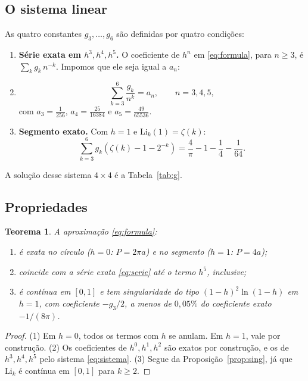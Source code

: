 \documentclass[11pt,a4paper]{article}
\newtheorem{teorema}{Teorema}
\theoremstyle{remark}
\begin{document}
\subsection{O sistema linear}

As quatro constantes $g_3,\dots,g_6$ são definidas por quatro condições:
\begin{enumerate}
\item \textbf{Série exata em $h^3,h^4,h^5$.} O coeficiente de $h^n$ em
\eqref{eq:formula}, para $n\ge3$, é $\sum_k g_k\,n^{-k}$. Impomos que ele seja igual a $a_n$:
\item[] \begin{equation}\label{eq:sistema}
\sum_{k=3}^{6}\frac{g_k}{n^k}=a_n,\qquad n=3,4,5,
\end{equation}
com $a_3=\frac1{256}$, $a_4=\frac{25}{16384}$ e $a_5=\frac{49}{65536}$.
\item \textbf{Segmento exato.} Com $h=1$ e $\mathrm{Li}_k(1)=\zeta(k)$:
\begin{equation}
\sum_{k=3}^{6}g_k\left(\zeta(k)-1-2^{-k}\right)=\frac4\pi-1-\frac14-\frac1{64}.
\end{equation}
\end{enumerate}
A solução desse sistema $4\times4$ é a Tabela~\ref{tab:g}.

\subsection{Propriedades}

\begin{teorema}
A aproximação \eqref{eq:formula}:
\begin{enumerate}
\item é exata no círculo ($h=0$: $P=2\pi a$) e no segmento ($h=1$: $P=4a$);
\item coincide com a série exata \eqref{eq:serie} até o termo $h^5$, inclusive;
\item é contínua em $[0,1]$ e tem singularidade do tipo $(1-h)^2\ln(1-h)$ em $h=1$, com coeficiente
$-g_3/2$, a menos de $0{,}05\%$ do coeficiente exato $-1/(8\pi)$.
\end{enumerate}
\end{teorema}
\begin{proof}
(1) Em $h=0$, todos os termos com $h$ se anulam. Em $h=1$, vale por construção.
(2) Os coeficientes de $h^0,h^1,h^2$ são exatos por construção, e os de $h^3,h^4,h^5$ pelo
sistema \eqref{eq:sistema}.
(3) Segue da Proposição~\ref{prop:sing}, já que $\mathrm{Li}_k$ é contínua em $[0,1]$ para $k\ge2$.
\end{proof}
\end{document}
